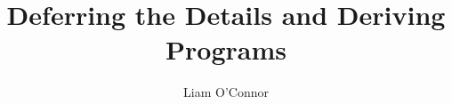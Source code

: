 \documentclass[sigplan,review]{acmart}\settopmatter{printfolios=true,printccs=false,printacmref=false}
\begin{document}
\title{Deferring the Details and Deriving Programs} %



\author{Liam O'Connor}

%
\end{document}
